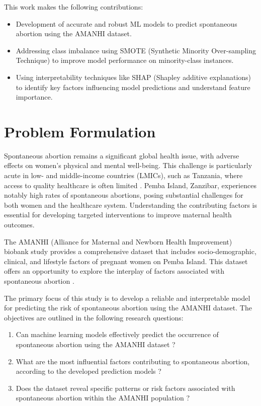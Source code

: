 \documentclass{article}
\begin{document}
This work makes the following contributions:
\begin{itemize}
    \item Development of accurate and robust ML models to predict spontaneous abortion using the AMANHI dataset.
    \item Addressing class imbalance using SMOTE (Synthetic Minority Over-sampling Technique) to improve model performance on minority-class instances.
    \item Using interpretability techniques like SHAP (Shapley additive explanations) to identify key factors influencing model predictions and understand feature importance.
\end{itemize}

\section{Problem Formulation}
Spontaneous abortion remains a significant global health issue, with adverse effects on women's physical and mental well-being. This challenge is particularly acute in low- and middle-income countries (LMICs), such as Tanzania, where access to quality healthcare is often limited \cite{aftab2021}. Pemba Island, Zanzibar, experiences notably high rates of spontaneous abortions, posing substantial challenges for both women and the healthcare system. Understanding the contributing factors is essential for developing targeted interventions to improve maternal health outcomes.

The AMANHI (Alliance for Maternal and Newborn Health Improvement) biobank study provides a comprehensive dataset that includes socio-demographic, clinical, and lifestyle factors of pregnant women on Pemba Island. This dataset offers an opportunity to explore the interplay of factors associated with spontaneous abortion \cite{aljameel2023}.

The primary focus of this study is to develop a reliable and interpretable model for predicting the risk of spontaneous abortion using the AMANHI dataset. The objectives are outlined in the following research questions:
\begin{enumerate}
    \item Can machine learning models effectively predict the occurrence of spontaneous abortion using the AMANHI dataset \cite{aftab2021}?
    \item What are the most influential factors contributing to spontaneous abortion, according to the developed prediction models \cite{wu2024}?
    \item Does the dataset reveal specific patterns or risk factors associated with spontaneous abortion within the AMANHI population \cite{setegn2024}?
\end{enumerate}
\end{document}
